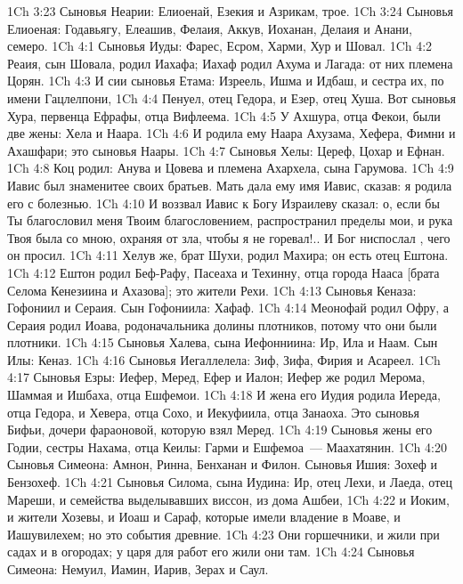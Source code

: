 \vs 1Ch 3:23 Сыновья Неарии: Елиоенай, Езекия и Азрикам, трое.
\vs 1Ch 3:24 Сыновья Елиоеная: Годавьягу, Елеашив, Фелаия, Аккув, Иоханан, Делаия и Анани, семеро.
\vs 1Ch 4:1 Сыновья Иуды: Фарес, Есром, Харми, Хур и Шовал.
\vs 1Ch 4:2 Реаия, сын Шовала, родил Иахафа; Иахаф родил Ахума и Лагада: от них племена Цорян.
\vs 1Ch 4:3 И сии сыновья Етама: Изреель, Ишма и Идбаш, и сестра их, по имени Гацлелпони,
\vs 1Ch 4:4 Пенуел, отец Гедора, и Езер, отец Хуша. Вот сыновья Хура, первенца Ефрафы, отца Вифлеема.
\rsbpar\vs 1Ch 4:5 У Ахшура, отца Фекои, были две жены: Хела и Наара.
\vs 1Ch 4:6 И родила ему Наара Ахузама, Хефера, Фимни и Ахашфари; это сыновья Наары.
\vs 1Ch 4:7 Сыновья Хелы: Цереф, Цохар и Ефнан.
\rsbpar\vs 1Ch 4:8 Коц родил: Анува и Цовева и племена Ахархела, сына Гарумова.
\rsbpar\vs 1Ch 4:9 Иавис был знаменитее своих братьев. Мать дала ему имя Иавис, сказав: я родила его с болезнью.
\vs 1Ch 4:10 И воззвал Иавис к Богу Израилеву  сказал: о, если бы Ты благословил меня Твоим благословением, распространил пределы мои, и рука Твоя была со мною, охраняя  от зла, чтобы я не горевал!.. И Бог ниспослал , чего он просил.
\rsbpar\vs 1Ch 4:11 Хелув же, брат Шухи, родил Махира; он есть отец Ештона.
\vs 1Ch 4:12 Ештон родил Беф-Рафу, Пасеаха и Техинну, отца города Нааса [брата Селома Кенезиина и Ахазова]; это жители Рехи.
\rsbpar\vs 1Ch 4:13 Сыновья Кеназа: Гофониил и Сераия. Сын Гофониила: Хафаф.
\vs 1Ch 4:14 Меонофай родил Офру, а Сераия родил Иоава, родоначальника долины плотников, потому что они были плотники.
\rsbpar\vs 1Ch 4:15 Сыновья Халева, сына Иефонниина: Ир, Ила и Наам. Сын Илы: Кеназ.
\vs 1Ch 4:16 Сыновья Иегаллелела: Зиф, Зифа, Фирия и Асареел.
\vs 1Ch 4:17 Сыновья Езры: Иефер, Меред, Ефер и Иалон; Иефер же родил Мерома, Шаммая и Ишбаха, отца Ешфемои.
\vs 1Ch 4:18 И жена его Иудия родила Иереда, отца Гедора, и Хевера, отца Сохо, и Иекуфиила, отца Занаоха. Это сыновья Бифьи, дочери фараоновой, которую взял Меред.
\vs 1Ch 4:19 Сыновья жены его Годии, сестры Нахама, отца Кеилы: Гарми и Ешфемоа~--- Маахатянин.
\vs 1Ch 4:20 Сыновья Симеона: Амнон, Ринна, Бенханан и Филон. Сыновья Ишия: Зохеф и Бензохеф.
\rsbpar\vs 1Ch 4:21 Сыновья Силома, сына Иудина: Ир, отец Лехи, и Лаеда, отец Мареши, и семейства выделывавших виссон, из дома Ашбеи,
\vs 1Ch 4:22 и Иоким, и жители Хозевы, и Иоаш и Сараф, которые имели владение в Моаве, и Иашувилехем; но это события древние.
\vs 1Ch 4:23 Они  горшечники, и жили при садах и в огородах; у царя для работ его жили они там.
\rsbpar\vs 1Ch 4:24 Сыновья Симеона: Немуил, Иамин, Иарив, Зерах и Саул.
